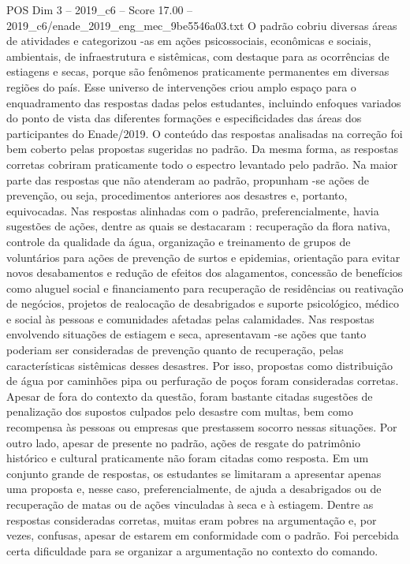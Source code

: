 \begin{textsample}{POS Dim 3 – 2019\_c6 – Score 17.00 – 2019\_c6/enade\_2019\_eng\_mec\_9be5546a03.txt}
O padrão cobriu diversas áreas de atividades e categorizou -as em ações psicossociais, econômicas e sociais, ambientais, de infraestrutura e sistêmicas, com destaque para as ocorrências de estiagens e secas, porque são fenômenos praticamente permanentes em diversas regiões do país.
Esse universo de intervenções criou amplo espaço para o enquadramento das respostas dadas pelos estudantes, incluindo enfoques variados do ponto de vista das diferentes formações e especificidades das áreas dos participantes do Enade/2019.
O conteúdo das respostas analisadas na correção foi bem coberto pelas propostas sugeridas no padrão.
Da mesma forma, as respostas corretas cobriram praticamente todo o espectro levantado pelo padrão.
Na maior parte das respostas que não atenderam ao padrão, propunham -se ações de prevenção, ou seja, procedimentos anteriores aos desastres e, portanto, equivocadas.
Nas respostas alinhadas com o padrão, preferencialmente, havia sugestões de ações, dentre as quais se destacaram : recuperação da flora nativa, controle da qualidade da água, organização e treinamento de grupos de voluntários para ações de prevenção de surtos e epidemias, orientação para evitar novos desabamentos e redução de efeitos dos alagamentos, concessão de benefícios como aluguel social e financiamento para recuperação de residências ou reativação de negócios, projetos de realocação de desabrigados e suporte psicológico, médico e social às pessoas e comunidades afetadas pelas calamidades.
Nas respostas envolvendo situações de estiagem e seca, apresentavam -se ações que tanto poderiam ser consideradas de prevenção quanto de recuperação, pelas características sistêmicas desses desastres.
Por isso, propostas como distribuição de água por caminhões pipa ou perfuração de poços foram consideradas corretas.
Apesar de fora do contexto da questão, foram bastante citadas sugestões de penalização dos supostos culpados pelo desastre com multas, bem como recompensa às pessoas ou empresas que prestassem socorro nessas situações.
Por outro lado, apesar de presente no padrão, ações de resgate do patrimônio histórico e cultural praticamente não foram citadas como resposta.
Em um conjunto grande de respostas, os estudantes se limitaram a apresentar apenas uma proposta e, nesse caso, preferencialmente, de ajuda a desabrigados ou de recuperação de matas ou de ações vinculadas à seca e à estiagem.
Dentre as respostas consideradas corretas, muitas eram pobres na argumentação e, por vezes, confusas, apesar de estarem em conformidade com o padrão.
Foi percebida certa dificuldade para se organizar a argumentação no contexto do comando.

\end{textsample}
